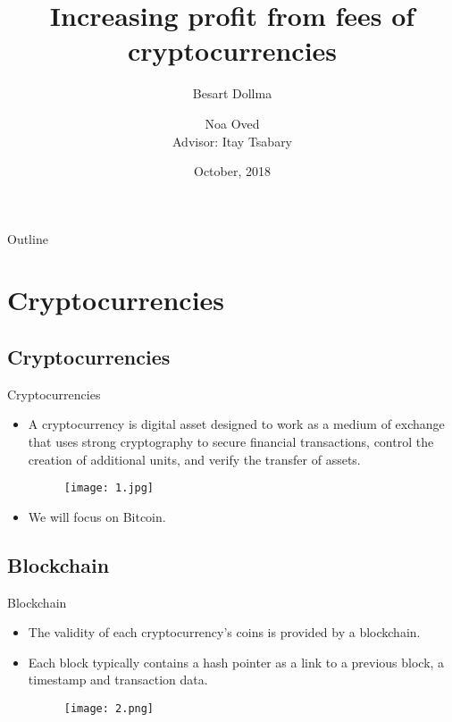 \documentclass{beamer}
\title{Increasing profit from fees of cryptocurrencies}
\subtitle{}
\author[]{Besart Dollma \and Noa Oved {\\\small Advisor: Itay Tsabary}}
\institute[] %
{
  Technion - Israel Institute of Technology
}
\date{October, 2018}
\begin{document}
\begin{frame}
  \titlepage
\end{frame}

\begin{frame}{Outline}
  \tableofcontents
\end{frame}



\section{Cryptocurrencies}
\subsection*{Cryptocurrencies}

\begin{frame}{Cryptocurrencies}{}
  \begin{itemize}
  \item {A cryptocurrency is digital asset designed to work as a medium 
  of exchange that uses strong cryptography to secure financial 
  transactions, control the creation of additional units, and verify 
  the transfer of assets.}
  \begin{figure}
      \centering
      \texttt{[image: 1.jpg]}
      \label{fig:my_label1}
  \end{figure}
  \item {We will focus on Bitcoin.}
  \end{itemize}
\end{frame}
\subsection*{Blockchain}

\begin{frame}{Blockchain} %
  \begin{itemize}
  \item {The validity of each cryptocurrency's coins is provided by a 
  blockchain.}
  \item {Each block typically contains a hash pointer as a link to a 
  previous block, a timestamp and transaction data.}
  \begin{figure}
      \centering
      \texttt{[image: 2.png]}
      \label{fig:my_label2}
  \end{figure}
  \end{itemize}
\end{frame}
\end{document}
